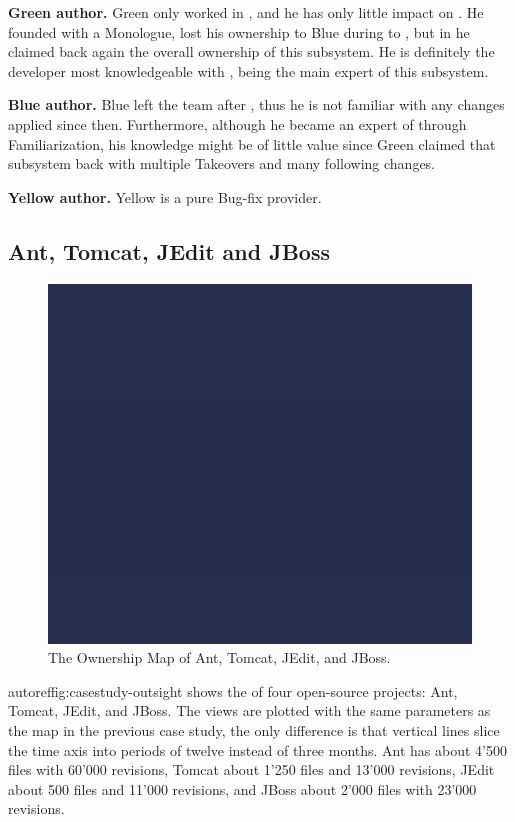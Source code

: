 \documentclass[10pt]{book}
\begin{document}
\textbf{Green author.} Green only worked in , and he has only little impact on . He founded  with a Monologue, lost his ownership to Blue during  to , but in  he claimed back again the overall ownership of this subsystem. He is definitely the developer most knowledgeable with , being the main expert of this subsystem.

\textbf{Blue author.} Blue left the team after , thus he is not familiar with any changes applied since then. Furthermore, although he became an expert of  through Familiarization, his knowledge might be of little value since Green claimed that subsystem back with multiple Takeovers and many following changes.

\textbf{Yellow author.} Yellow is a pure Bug-fix provider.

\subsection{Ant, Tomcat, JEdit and JBoss}

\begin{figure}[htb]
\begin{center}
\includegraphics[width=12.5cm]{casestudies-overview}
\caption{The Ownership Map of Ant, Tomcat, JEdit, and JBoss.}
\label{fig:casestudies-owerview}
\end{center}
\end{figure}

autoref{fig:casestudy-outsight} shows the \omap of four open-source projects: Ant, Tomcat, JEdit, and JBoss. The views are plotted with the same parameters as the map in the previous case study, the only difference is that vertical lines slice the time axis into periods of twelve instead of three months. Ant has about 4'500 files with 60'000 revisions, Tomcat about 1'250 files and 13'000 revisions, JEdit about 500 files and 11'000 revisions, and JBoss about 2'000 files with 23'000 revisions.
\end{document}
